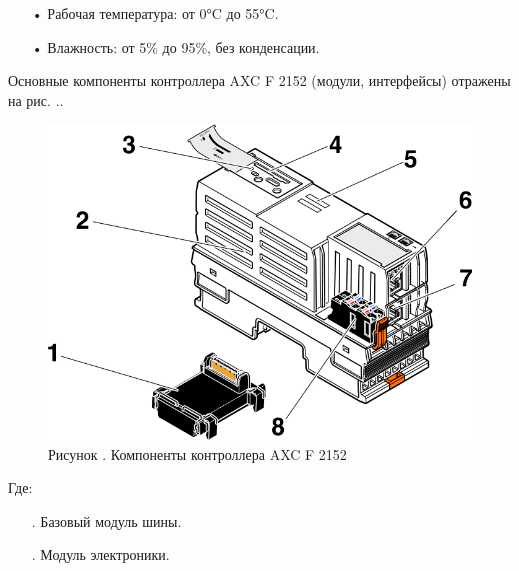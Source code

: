 {\begin{itemize}[leftmargin=2.15cm, labelwidth=0.65cm, labelsep=0.0cm]
\begin{itemize}[leftmargin=1.5cm, labelwidth=0.65cm, labelsep=0.0cm]
			\item[•] Рабочая температура: от 0°C до 55°C.
			
			\item[•] Влажность: от 5\% до 95\%, без конденсации.
			
		\end{itemize}
		
		\addtocounter{itemcntr}{1}
		
		\setcounter{itemcntr}{1}
	\end{itemize}
	 
	
	\par \redline Основные компоненты контроллера AXC F 2152 (модули, интерфейсы) отражены на рис. \thechaptercntr.\theimagecntr. 
	
	\begin{figure}[H]
		\centering
		\def\svgwidth{\textwidth}
		\includegraphics[scale=1.8]{images/pclnext_complect.png}
		\caption*{\gostFont Рисунок \thechaptercntr .\theimagecntr \spc {--} Компоненты контроллера AXC F 2152}
	\end{figure}  \addtocounter{imagecntr}{1}
	
	\par \redline Где:
	
	\begin{itemize}[leftmargin=2.15cm, labelwidth=0.65cm, labelsep=0.0cm] 
		
		\item[\theitemcntr. ]	Базовый модуль шины.
		
		\addtocounter{itemcntr}{1}
		
		\item[\theitemcntr. ] 	Модуль электроники.
		

\end{itemize}}
